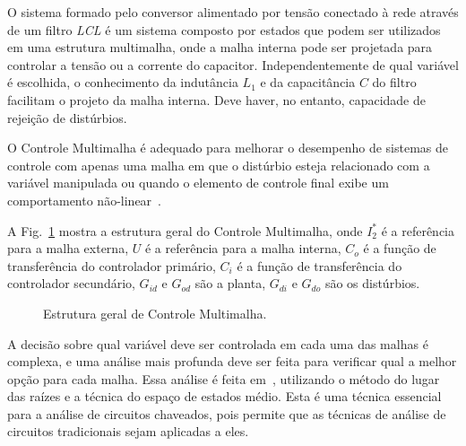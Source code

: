     O sistema formado pelo conversor alimentado por tensão conectado à rede através
    de um filtro \emph{LCL} é um sistema composto por estados que podem ser
    utilizados em uma estrutura multimalha, onde a malha interna pode ser projetada
    para controlar a tensão ou a corrente do capacitor. Independentemente de qual
    variável é escolhida, o conhecimento da indutância $L_1$ e da capacitância $C$
    do filtro facilitam o projeto da malha interna. Deve haver, no entanto, capacidade
    de rejeição de distúrbios.


    O Controle Multimalha é adequado para melhorar o desempenho
    de sistemas de controle com apenas uma malha em que o distúrbio esteja
    relacionado com a variável manipulada ou quando o elemento de controle final
    exibe um comportamento não-linear~\cite{ref:LEE}.

    A Fig.~\ref{fig:multiloop} mostra a estrutura geral do Controle Multimalha, onde
    $I_2^*$ é a referência para a malha externa, $U$ é a referência para a malha
    interna, $C_o$ é a função de transferência do controlador primário,
    $C_i$ é a função de transferência do controlador secundário, $G_{id}$ e
    $G_{od}$ são a planta, $G_{di}$ e $G_{do}$ são os distúrbios.


    \begin{figure}[htb]
        \centering{
            \def\svgwidth{0.9\textwidth}
            }
        \renewcommand\figurename{Fig.}
        \caption{Estrutura geral de Controle Multimalha.}
        \label{fig:multiloop}
    \end{figure}

    A decisão sobre qual variável deve ser controlada em cada uma das malhas é complexa,
    e uma análise mais profunda deve ser feita para verificar qual a melhor
    opção para cada malha. Essa análise é feita em~\cite{ref:NASER}, utilizando o
    método do lugar das raízes e a técnica do espaço de estados médio. Esta é uma técnica
    essencial para a análise de circuitos chaveados, pois permite que as técnicas de
    análise de circuitos tradicionais sejam aplicadas a eles.

